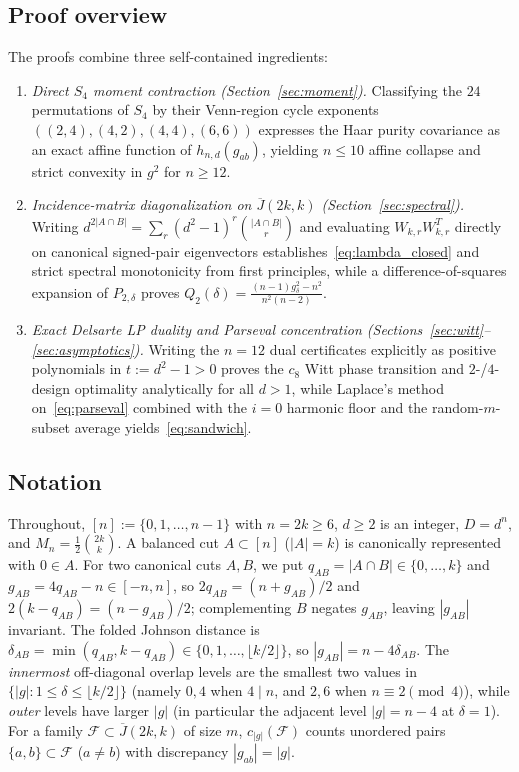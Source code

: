 \documentclass[11pt,reqno]{amsart}
\theoremstyle{definition}
\theoremstyle{remark}
\newcommand{\Jbar}{\overline{J}}
\newcommand{\F}{\mathcal{F}}
\begin{document}
\subsection{Proof overview}\label{sec:overview}
The proofs combine three self-contained ingredients:
\begin{enumerate}
\item \emph{Direct $S_4$ moment contraction (Section~\ref{sec:moment}).} Classifying the $24$ permutations of $S_4$ by their Venn-region cycle exponents $((2,4), (4,2), (4,4), (6,6))$ expresses the Haar purity covariance as an exact affine function of $h_{n,d}(g_{ab})$, yielding $n \le 10$ affine collapse and strict convexity in $g^2$ for $n \ge 12$.
\item \emph{Incidence-matrix diagonalization on $\Jbar(2k,k)$ (Section~\ref{sec:spectral}).} Writing $d^{2|A\cap B|} = \sum_r (d^2-1)^r \binom{|A\cap B|}{r}$ and evaluating $W_{k,r}W_{k,r}^T$ directly on canonical signed-pair eigenvectors establishes~\eqref{eq:lambda_closed} and strict spectral monotonicity from first principles, while a difference-of-squares expansion of $P_{2,\delta}$ proves $Q_2(\delta) = \frac{(n-1)g_\delta^2 - n^2}{n^2(n-2)}$.
\item \emph{Exact Delsarte LP duality and Parseval concentration (Sections~\ref{sec:witt}--\ref{sec:asymptotics}).} Writing the $n=12$ dual certificates explicitly as positive polynomials in $t := d^2 - 1 > 0$ proves the $c_8$ Witt phase transition and $2$-/$4$-design optimality analytically for all $d > 1$, while Laplace's method on~\eqref{eq:parseval} combined with the $i=0$ harmonic floor and the random-$m$-subset average yields~\eqref{eq:sandwich}.
\end{enumerate}

\subsection{Notation}\label{sec:notation}
Throughout, $[n] := \{0,1,\dots,n-1\}$ with $n = 2k \ge 6$, $d \ge 2$ is an integer, $D = d^n$, and $M_n = \frac{1}{2}\binom{2k}{k}$. A balanced cut $A \subset [n]$ ($|A|=k$) is canonically represented with $0 \in A$. For two canonical cuts $A,B$, we put $q_{AB} = |A \cap B| \in \{0,\dots,k\}$ and $g_{AB} = 4q_{AB} - n \in [-n,n]$, so $2q_{AB} = (n+g_{AB})/2$ and $2(k-q_{AB}) = (n-g_{AB})/2$; complementing $B$ negates $g_{AB}$, leaving $|g_{AB}|$ invariant. The folded Johnson distance is $\delta_{AB} = \min(q_{AB}, k - q_{AB}) \in \{0,1,\dots,\lfloor k/2 \rfloor\}$, so $|g_{AB}| = n - 4\delta_{AB}$. The \emph{innermost} off-diagonal overlap levels are the smallest two values in $\{|g| : 1 \le \delta \le \lfloor k/2 \rfloor\}$ (namely $0,4$ when $4 \mid n$, and $2,6$ when $n \equiv 2 \pmod 4$), while \emph{outer} levels have larger $|g|$ (in particular the adjacent level $|g| = n - 4$ at $\delta = 1$). For a family $\F \subset \Jbar(2k,k)$ of size $m$, $c_{|g|}(\F)$ counts unordered pairs $\{a,b\} \subset \F$ ($a \ne b$) with discrepancy $|g_{ab}| = |g|$.
\end{document}
